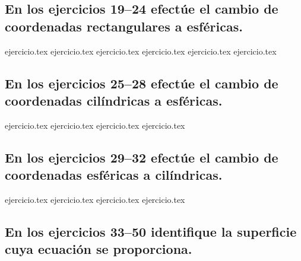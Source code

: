\vspace{0.3cm}
\subsection*{En los ejercicios 19--24 efectúe el cambio de coordenadas rectangulares a esféricas.}

\begin{enumerate}
    \setcounter{enumi}{18}
    {ejercicio.tex}
{ejercicio.tex}
{ejercicio.tex}
{ejercicio.tex}
{ejercicio.tex}
{ejercicio.tex}
\end{enumerate}

\vspace{0.3cm}
\subsection*{En los ejercicios 25--28 efectúe el cambio de coordenadas cilíndricas a esféricas.}

\begin{enumerate}
    \setcounter{enumi}{24}
    {ejercicio.tex}
{ejercicio.tex}
{ejercicio.tex}
{ejercicio.tex}
\end{enumerate}

\vspace{0.3cm}
\subsection*{En los ejercicios 29--32 efectúe el cambio de coordenadas esféricas a cilíndricas.}

\begin{enumerate}
    \setcounter{enumi}{28}
    {ejercicio.tex}
{ejercicio.tex}
{ejercicio.tex}
{ejercicio.tex}
\end{enumerate}

\vspace{0.3cm}
\subsection*{En los ejercicios 33--50 identifique la superficie cuya ecuación se proporciona.}

